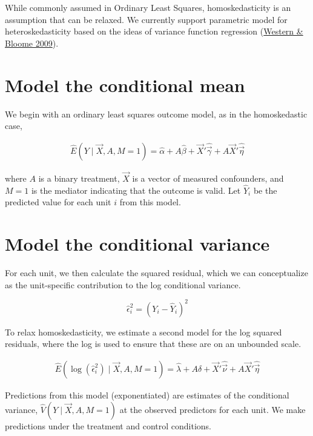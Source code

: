 \documentclass[
]{book}
\begin{document}
While commonly assumed in Ordinary Least Squares, homoskedasticity is an assumption that can be relaxed. We currently support parametric model for heteroskedasticity based on the ideas of variance function regression (\href{https://doi.org/10.1111/j.1467-9531.2009.01222.x}{Western \& Bloome 2009}).

\hypertarget{model-the-conditional-mean}{%
\section{Model the conditional mean}\label{model-the-conditional-mean}}

We begin with an ordinary least squares outcome model, as in the homoskedastic case,

\[\begin{aligned}
\hat{E}(Y\mid \vec{X},A,M = 1) = \hat\alpha + A\hat\beta  + \vec{X}'\hat{\vec\gamma} + A\vec{X}'\hat{\vec\eta}
\end{aligned}\]

where \(A\) is a binary treatment, \(\vec{X}\) is a vector of measured confounders, and \(M = 1\) is the mediator indicating that the outcome is valid. Let \(\hat{Y}_i\) be the predicted value for each unit \(i\) from this model.

\hypertarget{model-the-conditional-variance}{%
\section{Model the conditional variance}\label{model-the-conditional-variance}}

For each unit, we then calculate the squared residual, which we can conceptualize as the unit-specific contribution to the log conditional variance.

\[\hat\epsilon_i^2 = \left(Y_i - \hat{Y}_i\right)^2\]

To relax homoskedasticity, we estimate a second model for the log squared residuals, where the log is used to ensure that these are on an unbounded scale.

\[\begin{aligned}
\hat{E}(\log(\hat\epsilon_i^2)\mid \vec{X},A,M = 1) = \hat\lambda + A\hat\delta  + \vec{X}'\hat{\vec\nu} + A\vec{X}'\hat{\vec\eta}
\end{aligned}\]

Predictions from this model (exponentiated) are estimates of the conditional variance, \(\hat{V}(Y\mid \vec{X},A,M=1)\) at the observed predictors for each unit. We make predictions under the treatment and control conditions.
\end{document}
